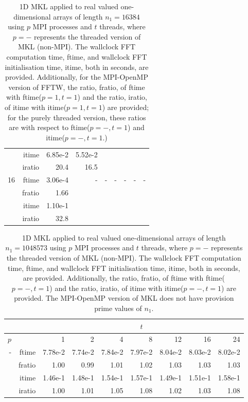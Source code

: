 \documentclass[a4]{article}
\begin{document}
\begin{table}
\begin{center}
\begin{tabular}{|r|r|r|r|r|r|r|r|r|}
      & itime &   6.85e-2 &   5.52e-2 &         & & & & \\
      & iratio &    20.4 &   16.5 &       & & & & \\ \hline
    16 & ftime  &     3.06e-4 &    - & - & - & - & - & - \\ 
     & fratio &      1.66 &    &  &  &  &  &  \\
      & itime &      1.10e-1 &   & & & & & \\
      & iratio &    32.8 &     & & & & & \\ \hline
\end{tabular}
\caption{1D MKL applied to real valued one-dimensional arrays of length $n_1=16384$ using $p$ MPI processes and $t$ threads, where $p=-$ represents the threaded version of MKL (non-MPI). The wallclock FFT computation time, ftime, and wallclock FFT initialisation time, itime, both in seconds, are provided. Additionally, for the MPI-OpenMP version of FFTW, the ratio, fratio, of ftime  with ftime($p=1,t=1$) and the ratio, iratio, of itime  with itime($p=1,t=1$) are provided; for the purely threaded version, these ratios are with respect to ftime($p=-,t=1$) and itime($p=-,t=1$.) }\label{Tbl:MKL1d16384}
\end{center}
\end{table}



\begin{table}
\begin{center}
\begin{tabular}{|r|r|r|r|r|r|r|r|r|}
\hline 
     &  & \multicolumn{7}{c|}{$t$} \\ \hline
    $p$  &  & 1           & 2    & 4    & 8    & 12   & 16    & 24  \\ \hline\hline
    -  & ftime &  7.78e-2 &   7.74e-2 &   7.84e-2 &   7.97e-2 &   8.04e-2 &   8.03e-2 &   8.02e-2    \\ 
      & fratio &  1.00 &   0.99 &   1.01 &   1.02 &   1.03 &   1.03 &   1.03    \\ 
     & itime &    1.46e-1 &   1.48e-1 &   1.54e-1 &   1.57e-1 &   1.49e-1 &   1.51e-1 &   1.58e-1     \\ 
     & iratio &   1.00 &   1.01 &   1.05 &   1.08 &   1.02 &   1.03 &   1.08    \\ \hline
\end{tabular}
\caption{1D MKL applied to real valued one-dimensional arrays of length $n_1=1048573$ using $p$ MPI processes and $t$ threads, where $p=-$ represents the threaded version of MKL (non-MPI). The wallclock FFT computation time, ftime, and wallclock FFT initialisation time, itime, both in seconds, are provided. Additionally, the ratio, fratio, of ftime  with ftime($p=-,t=1$) and the ratio, iratio, of itime  with itime($p=-,t=1$) are provided. The MPI-OpenMP version of MKL does not have provision prime values of $n_1.$  }\label{Tbl:MKL1d1048573}
\end{center}
\end{table}
\end{document}
